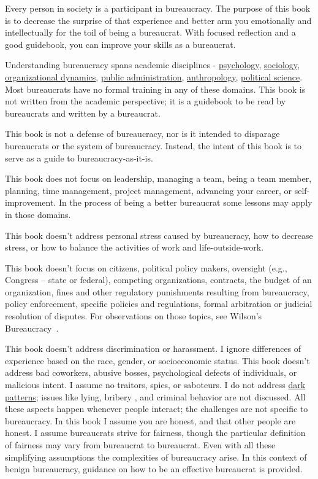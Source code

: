 Every person in society is a participant in bureaucracy. The purpose of this book is to decrease the surprise of that experience and better arm you emotionally and intellectually for the toil of being a bureaucrat. With focused reflection and a good guidebook, you can improve your skills as a bureaucrat. 

Understanding bureaucracy spans academic disciplines - \href{https://en.wikipedia.org/wiki/Psychology}{psychology}, \href{https://en.wikipedia.org/wiki/Sociology}{sociology}, \href{https://en.wikipedia.org/wiki/Organizational_behavior}{organizational dynamics}, \href{https://en.wikipedia.org/wiki/Public_administration}{public administration}, \href{https://en.wikipedia.org/wiki/Anthropology}{anthropology}, \href{https://en.wikipedia.org/wiki/Political_science}{political science}. Most bureaucrats have no formal training in any of these domains. This book is not written from the academic perspective; it is a guidebook to be read by bureaucrats and written by a bureaucrat. 

This book is not a defense of bureaucracy, nor is it intended to disparage bureaucrats or the system of bureaucracy. Instead, the intent of this book is to serve as a guide to bureaucracy-as-it-is. 

This book does not focus on leadership, managing a team, being a team member, planning, time management, project management, advancing your career, or self-improvement. In the process of being a better bureaucrat some lessons may apply in those domains.

This book doesn't address personal stress caused by bureaucracy, how to decrease stress, or how to balance the activities of work and life-outside-work. 


This book doesn't focus on citizens, political policy makers, oversight (e.g., Congress -- state or federal), competing organizations, contracts, the budget of an organization, fines and other regulatory punishments resulting from bureaucracy, policy enforcement, specific policies and regulations, formal arbitration or judicial resolution of disputes. For observations on those topics, see Wilson's Bureaucracy~\cite{1991_Wilson}.

This book doesn't address discrimination or harassment. I ignore differences of experience based on the race, gender, or socioeconomic status. This book doesn't address bad coworkers, abusive bosses, psychological defects of individuals, or malicious intent. I assume no traitors, spies, or saboteurs. I do not address \href{https://en.wikipedia.org/wiki/Dark_pattern}{dark patterns}; issues like lying, bribery \cite{2021_Ang}, and criminal behavior are not discussed. All these aspects happen whenever people interact; the challenges are not specific to bureaucracy. In this book I assume you are honest, and that other people are honest.  
I assume bureaucrats strive for fairness, though the particular definition of fairness may vary from bureaucrat to bureaucrat. 
Even with all these simplifying assumptions the complexities of bureaucracy arise. In this context of benign bureaucracy, guidance on how to be an effective bureaucrat is provided.


